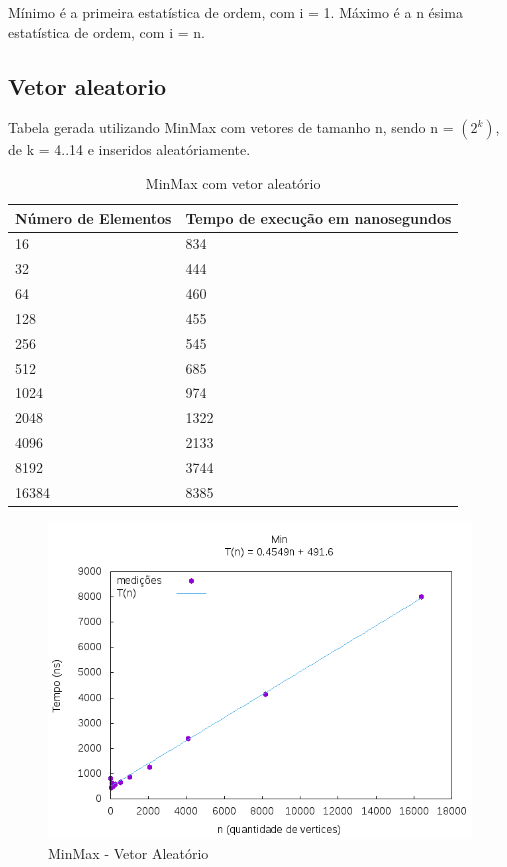 \documentclass[12pt,a4paper,twoside]{report}
\begin{document}
Mínimo é a primeira estatística de ordem, com i = 1.
Máximo é a n ésima estatística de ordem, com i = n.

\subsection{Vetor aleatorio}
Tabela gerada utilizando MinMax com vetores de tamanho n, sendo n = $(2^k)$, de k = 4..14 e inseridos aleatóriamente.
\begin{table}[H]
\centering
\caption{MinMax com vetor aleatório}
\label{my-label}
\begin{tabular}{|l|l|}
\hline
\multicolumn{1}{|c|}{\textbf{Número de Elementos}} & \multicolumn{1}{c|}{\textbf{Tempo de execução em nanosegundos}} \\ \hline
16 & 834 \\ \hline
32 & 444 \\ \hline
64 & 460 \\ \hline
128 & 455 \\ \hline
256 & 545 \\ \hline
512 & 685 \\ \hline
1024 & 974 \\ \hline
2048 & 1322 \\ \hline
4096 & 2133 \\ \hline
8192 & 3744 \\ \hline
16384 & 8385 \\ \hline
\end{tabular}
\end{table}

\begin{figure}[H]
    \centering
    \includegraphics[width=0.7\linewidth]{graficos/Min Max/Aleatorio/MinMax.png}
  \caption{MinMax - Vetor Aleatório}
\end{figure}
\end{document}
